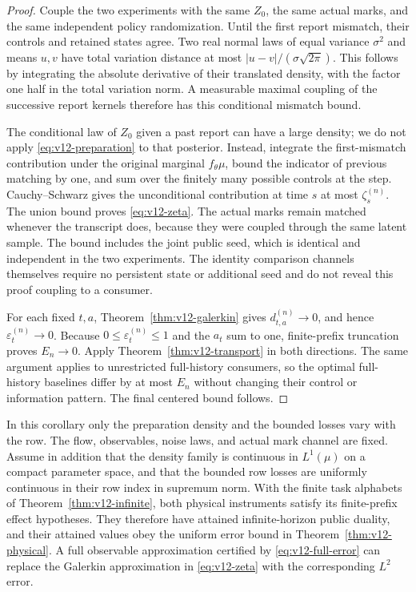 \begin{proof}
Couple the two experiments with the same $Z_0$, the same actual marks,
and the same independent policy randomization. Until the first report
mismatch, their controls and retained states agree. Two real normal laws
of equal variance $\sigma^2$ and means $u,v$ have total variation distance
at most $|u-v|/(\sigma\sqrt{2\pi})$. This follows by integrating the
absolute derivative of their translated density, with the factor one
half in the total variation norm. A measurable maximal coupling of the
successive report kernels therefore has this conditional mismatch bound.

The conditional law of $Z_0$ given a past report can have a large density;
we do not apply \eqref{eq:v12-preparation} to that posterior. Instead,
integrate the first-mismatch contribution under the original marginal
$f_\theta\mu$, bound the indicator of previous matching by one, and
sum over the finitely many possible controls at the step. Cauchy--Schwarz
gives the unconditional contribution at time $s$ at most
$\zeta_s^{(n)}$. The union bound proves \eqref{eq:v12-zeta}. The actual
marks remain matched whenever the transcript does, because they were
coupled through the same latent sample. The bound includes the joint
public seed, which is identical and independent in the two experiments.
The identity comparison channels themselves require no persistent state
or additional seed and do not reveal this proof coupling to a consumer.

For each fixed $t,a$, Theorem~\ref{thm:v12-galerkin} gives
$d_{t,a}^{(n)}\to0$, and hence $\varepsilon_t^{(n)}\to0$.
Because $0\le\varepsilon_t^{(n)}\le1$ and the $a_t$ sum to one,
finite-prefix truncation proves $E_n\to0$. Apply
Theorem~\ref{thm:v12-transport} in both directions. The same argument
applies to unrestricted full-history consumers, so the optimal
full-history baselines differ by at most $E_n$ without changing their
control or information pattern. The final centered bound follows.
\end{proof}

\begin{corollary}
\label{cor:v12-physical-duality}
In this corollary only the preparation density and the bounded losses
vary with the row. The flow, observables, noise laws, and actual mark
channel are fixed. Assume in addition that the density family is continuous in $L^1(\mu)$
on a compact parameter space, and that the bounded row losses are
uniformly continuous in their row index in supremum norm. With the
finite task alphabets of Theorem~\ref{thm:v12-infinite}, both physical
instruments satisfy its finite-prefix effect hypotheses. They therefore
have attained infinite-horizon public duality, and their attained values
obey the uniform error bound in Theorem~\ref{thm:v12-physical}.
A full observable approximation certified by
\eqref{eq:v12-full-error} can replace the Galerkin approximation in
\eqref{eq:v12-zeta} with the corresponding $L^2$ error.
\end{corollary}

